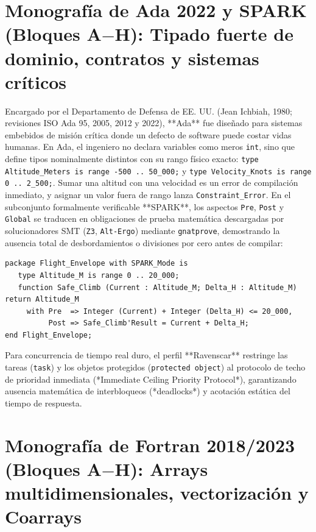 \documentclass{book}
\begin{document}
\section{Monografía de Ada 2022 y SPARK (Bloques A\(-\)H): Tipado fuerte de dominio, contratos y sistemas críticos}

Encargado por el Departamento de Defensa de EE. UU. (Jean Ichbiah, 1980; revisiones ISO Ada 95, 2005, 2012 y 2022), **Ada** fue diseñado para sistemas embebidos de misión crítica donde un defecto de software puede costar vidas humanas. En Ada, el ingeniero no declara variables como meros \texttt{int}, sino que define tipos nominalmente distintos con su rango físico exacto: \texttt{type Altitude\_Meters is range -500 .. 50\_000;} y \texttt{type Velocity\_Knots is range 0 .. 2\_500;}. Sumar una altitud con una velocidad es un error de compilación inmediato, y asignar un valor fuera de rango lanza \texttt{Constraint\_Error}. En el subconjunto formalmente verificable **SPARK**, los aspectos \texttt{Pre}, \texttt{Post} y \texttt{Global} se traducen en obligaciones de prueba matemática descargadas por solucionadores SMT (\texttt{Z3}, \texttt{Alt-Ergo}) mediante \texttt{gnatprove}, demostrando la ausencia total de desbordamientos o divisiones por cero antes de compilar:
\begin{lstlisting}[style=studium]
package Flight_Envelope with SPARK_Mode is
   type Altitude_M is range 0 .. 20_000;
   function Safe_Climb (Current : Altitude_M; Delta_H : Altitude_M) return Altitude_M
     with Pre  => Integer (Current) + Integer (Delta_H) <= 20_000,
          Post => Safe_Climb'Result = Current + Delta_H;
end Flight_Envelope;
\end{lstlisting}
Para concurrencia de tiempo real duro, el perfil **Ravenscar** restringe las tareas (\texttt{task}) y los objetos protegidos (\texttt{protected object}) al protocolo de techo de prioridad inmediata (*Immediate Ceiling Priority Protocol*), garantizando ausencia matemática de interbloqueos (*deadlocks*) y acotación estática del tiempo de respuesta.

\section{Monografía de Fortran 2018/2023 (Bloques A\(-\)H): Arrays multidimensionales, vectorización y Coarrays}
\end{document}
